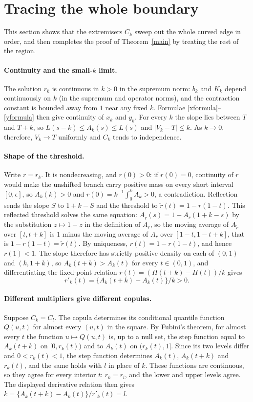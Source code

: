 \documentclass[11pt,a4paper]{article}
\theoremstyle{remark}
\newcommand{\1}{\mathbf 1}
\begin{document}
\section{Tracing the whole boundary}\label{sec:trace}
This section shows that the extremisers $C_k$ sweep out the whole curved edge in order, and then completes the proof of Theorem~\ref{main} by treating the rest of the region.

\paragraph{Continuity and the small-$k$ limit.} The solution $r_k$ is continuous in $k>0$ in the supremum norm: $b_k$ and $K_k$ depend continuously on $k$ (in the supremum and operator norms), and the contraction constant is bounded away from $1$ near any fixed $k$. Formulae \eqref{xformula}--\eqref{yformula} then give continuity of $x_k$ and $y_k$. For every $k$ the slope lies between $T$ and $T+k$, so $L(s-k)\le A_k(s)\le L(s)$ and $|V_k-T|\le k$. As $k\to0$, therefore, $V_k\to T$ uniformly and $C_k$ tends to independence.

\paragraph{Shape of the threshold.} Write $r=r_k$. It is nondecreasing, and $r(0)>0$: if $r(0)=0$, continuity of $r$ would make the unshifted branch carry positive mass on every short interval $[0,\epsilon]$, so $A_k(k)>0$ and $r(0)=k^{-1}\int_0^kA_k>0$, a contradiction. Reflection sends the slope $S$ to $1+k-S$ and the threshold to $\tilde r(t)=1-r(1-t)$. This reflected threshold solves the same equation: $A_{\tilde r}(s)=1-A_r(1+k-s)$ by the substitution $z\mapsto1-z$ in the definition of $A_r$, so the moving average of $A_{\tilde r}$ over $[t,t+k]$ is $1$ minus the moving average of $A_r$ over $[1-t,1-t+k]$, that is $1-r(1-t)=\tilde r(t)$. By uniqueness, $r(t)=1-r(1-t)$, and hence $r(1)<1$. The slope therefore has strictly positive density on each of $(0,1)$ and $(k,1+k)$, so $A_k(t+k)>A_k(t)$ for every $t\in(0,1)$, and differentiating the fixed-point relation $r(t)=(H(t+k)-H(t))/k$ gives
\[
 r'_k(t)=\{A_k(t+k)-A_k(t)\}/k>0.
\]

\paragraph{Different multipliers give different copulas.} Suppose $C_k=C_l$. The copula determines its conditional quantile function $Q(u,t)$ for almost every $(u,t)$ in the square. By Fubini's theorem, for almost every $t$ the function $u\mapsto Q(u,t)$ is, up to a null set, the step function equal to $A_k(t+k)$ on $[0,r_k(t))$ and to $A_k(t)$ on $(r_k(t),1]$. Since its two levels differ and $0<r_k(t)<1$, the step function determines $A_k(t)$, $A_k(t+k)$ and $r_k(t)$, and the same holds with $l$ in place of $k$. These functions are continuous, so they agree for every interior $t$: $r_k=r_l$, and the lower and upper levels agree. The displayed derivative relation then gives $k=\{A_k(t+k)-A_k(t)\}/r'_k(t)=l$.
\end{document}
